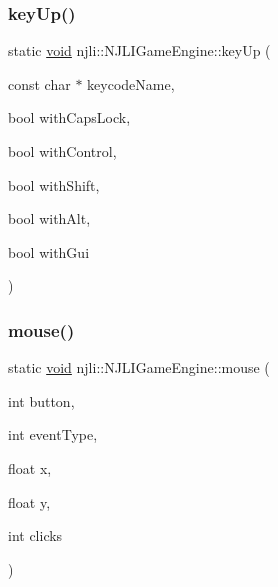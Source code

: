 \subsubsection{\texorpdfstring{key\+Up()}{keyUp()}}
{\footnotesize\ttfamily static \mbox{\hyperlink{_thread_8h_af1e856da2e658414cb2456cb6f7ebc66}{void}} njli\+::\+N\+J\+L\+I\+Game\+Engine\+::key\+Up (\begin{DoxyParamCaption}\item[{const char $\ast$}]{keycode\+Name,  }\item[{bool}]{with\+Caps\+Lock,  }\item[{bool}]{with\+Control,  }\item[{bool}]{with\+Shift,  }\item[{bool}]{with\+Alt,  }\item[{bool}]{with\+Gui }\end{DoxyParamCaption})\hspace{0.3cm}{\ttfamily [static]}}

\mbox{\label{classnjli_1_1_n_j_l_i_game_engine_a73a62c2624ce57bf6ba7493c096c2c21}} 
\subsubsection{\texorpdfstring{mouse()}{mouse()}}
{\footnotesize\ttfamily static \mbox{\hyperlink{_thread_8h_af1e856da2e658414cb2456cb6f7ebc66}{void}} njli\+::\+N\+J\+L\+I\+Game\+Engine\+::mouse (\begin{DoxyParamCaption}\item[{int}]{button,  }\item[{int}]{event\+Type,  }\item[{float}]{x,  }\item[{float}]{y,  }\item[{int}]{clicks }\end{DoxyParamCaption})\hspace{0.3cm}{\ttfamily [static]}}

\mbox{\label{classnjli_1_1_n_j_l_i_game_engine_a6fcc45cad0ceac29634f0f76bd922362}} 
